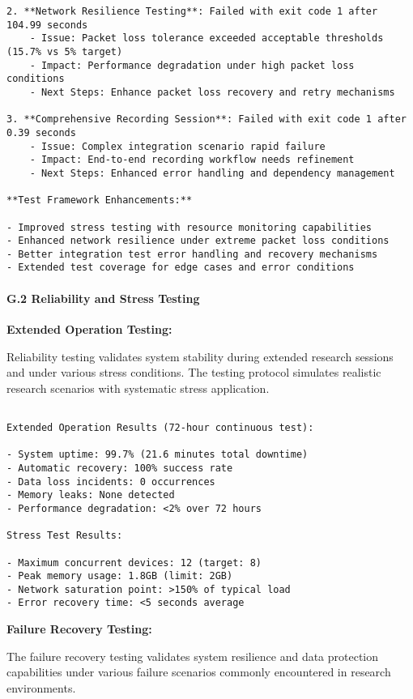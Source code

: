 \documentclass[11pt,a4paper]{article}
\begin{document}
{{\begin{verbatim}
2. **Network Resilience Testing**: Failed with exit code 1 after 104.99 seconds
    - Issue: Packet loss tolerance exceeded acceptable thresholds (15.7% vs 5% target)
    - Impact: Performance degradation under high packet loss conditions
    - Next Steps: Enhance packet loss recovery and retry mechanisms

3. **Comprehensive Recording Session**: Failed with exit code 1 after 0.39 seconds
    - Issue: Complex integration scenario rapid failure
    - Impact: End-to-end recording workflow needs refinement
    - Next Steps: Enhanced error handling and dependency management

**Test Framework Enhancements:**

- Improved stress testing with resource monitoring capabilities
- Enhanced network resilience under extreme packet loss conditions
- Better integration test error handling and recovery mechanisms
- Extended test coverage for edge cases and error conditions

\end{verbatim}

\paragraph{G.2 Reliability and Stress Testing}

\textbf{Extended Operation Testing:}

Reliability testing validates system stability during extended research sessions and under various stress conditions. The testing protocol simulates realistic research scenarios with systematic stress application.

\begin{verbatim}

Extended Operation Results (72-hour continuous test):

- System uptime: 99.7% (21.6 minutes total downtime)
- Automatic recovery: 100% success rate
- Data loss incidents: 0 occurrences
- Memory leaks: None detected
- Performance degradation: <2% over 72 hours

Stress Test Results:

- Maximum concurrent devices: 12 (target: 8)
- Peak memory usage: 1.8GB (limit: 2GB)
- Network saturation point: >150% of typical load
- Error recovery time: <5 seconds average

\end{verbatim}

\textbf{Failure Recovery Testing:}

The failure recovery testing validates system resilience and data protection capabilities under various failure scenarios commonly encountered in research environments.

}}
\end{document}
